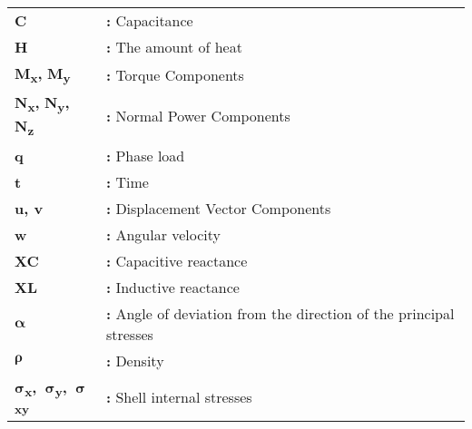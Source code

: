 \begin{tabular}{@{}p{2cm}l}
{\bf{C}} & {\bf:} Capacitance\\
{\bf H} & {\bf:} The amount of heat\\
{\bf M\textsubscript{x},} {\bf M\textsubscript{y}} & {\bf:} Torque Components\\
{\bf N\textsubscript{x},} {\bf N\textsubscript{y},} {\bf N\textsubscript{z}} & {\bf:} Normal Power Components\\
{\bf q} & {\bf:} Phase load\\
{\bf t} & {\bf:} Time\\
{\bf u, v} & {\bf:} Displacement Vector Components\\
{\bf w} & {\bf:} Angular velocity\\
{\bf XC} & {\bf:} Capacitive reactance\\
{\bf XL} & {\bf:}  Inductive reactance\\
{$\boldsymbol\alpha$} & {\bf:} Angle of deviation from the direction of the principal stresses\\
{$\boldsymbol\rho$} & {\bf:} Density\\
$\boldsymbol\sigma$\bf\textsubscript{x},~$\boldsymbol\sigma$\bf\textsubscript{y},~$\boldsymbol\sigma$\bf\textsubscript{xy} & {\bf:} Shell internal stresses\\
\end{tabular}

